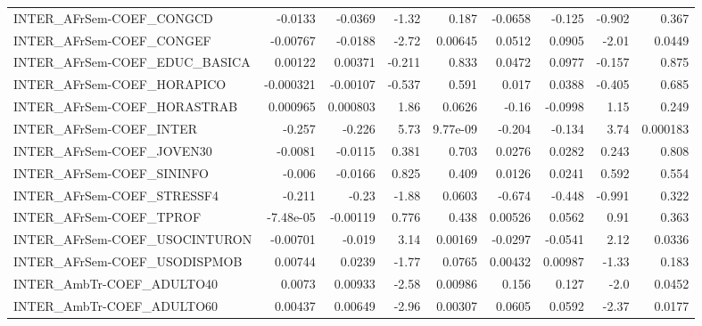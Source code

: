 \begin{tabular}{lrrrrrrrr}
INTER\_AFrSem-COEF\_CONGCD              &     -0.0133 &      -0.0369 &    -1.32 &    0.187 &    -0.0658 &      -0.125 &       -0.902 &         0.367 \\
INTER\_AFrSem-COEF\_CONGEF              &    -0.00767 &      -0.0188 &    -2.72 &  0.00645 &     0.0512 &      0.0905 &        -2.01 &        0.0449 \\
INTER\_AFrSem-COEF\_EDUC\_BASICA         &     0.00122 &      0.00371 &   -0.211 &    0.833 &     0.0472 &      0.0977 &       -0.157 &         0.875 \\
INTER\_AFrSem-COEF\_HORAPICO            &   -0.000321 &     -0.00107 &   -0.537 &    0.591 &      0.017 &      0.0388 &       -0.405 &         0.685 \\
INTER\_AFrSem-COEF\_HORASTRAB           &    0.000965 &     0.000803 &     1.86 &   0.0626 &      -0.16 &     -0.0998 &         1.15 &         0.249 \\
INTER\_AFrSem-COEF\_INTER               &      -0.257 &       -0.226 &     5.73 & 9.77e-09 &     -0.204 &      -0.134 &         3.74 &      0.000183 \\
INTER\_AFrSem-COEF\_JOVEN30             &     -0.0081 &      -0.0115 &    0.381 &    0.703 &     0.0276 &      0.0282 &        0.243 &         0.808 \\
INTER\_AFrSem-COEF\_SININFO             &      -0.006 &      -0.0166 &    0.825 &    0.409 &     0.0126 &      0.0241 &        0.592 &         0.554 \\
INTER\_AFrSem-COEF\_STRESSF4            &      -0.211 &        -0.23 &    -1.88 &   0.0603 &     -0.674 &      -0.448 &       -0.991 &         0.322 \\
INTER\_AFrSem-COEF\_TPROF               &   -7.48e-05 &     -0.00119 &    0.776 &    0.438 &    0.00526 &      0.0562 &         0.91 &         0.363 \\
INTER\_AFrSem-COEF\_USOCINTURON         &    -0.00701 &       -0.019 &     3.14 &  0.00169 &    -0.0297 &     -0.0541 &         2.12 &        0.0336 \\
INTER\_AFrSem-COEF\_USODISPMOB          &     0.00744 &       0.0239 &    -1.77 &   0.0765 &    0.00432 &     0.00987 &        -1.33 &         0.183 \\
INTER\_AmbTr-COEF\_ADULTO40             &      0.0073 &      0.00933 &    -2.58 &  0.00986 &      0.156 &       0.127 &         -2.0 &        0.0452 \\
INTER\_AmbTr-COEF\_ADULTO60             &     0.00437 &      0.00649 &    -2.96 &  0.00307 &     0.0605 &      0.0592 &        -2.37 &        0.0177 \\

\end{tabular}
